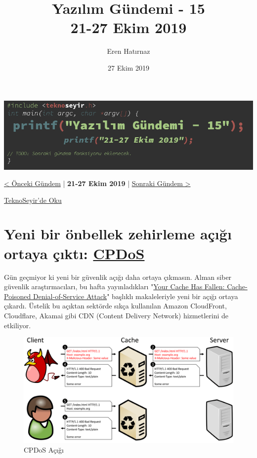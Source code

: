 \documentclass[11pt]{article}
\author{Eren Hatırnaz}
\date{27 Ekim 2019}
\title{Yazılım Gündemi - 15\\\medskip
\large 21-27 Ekim 2019}
\begin{document}
\maketitle
\tableofcontents \clearpage\shorthandoff{=}

\begin{center}
\includegraphics[width=.9\linewidth]{gorseller/yazilim-gundemi-banner.png}
\end{center}

\begin{center}
\href{../14/yazilim-gundemi-14.pdf}{< Önceki Gündem} | \textbf{21-27 Ekim 2019} | \href{../16/yazilim-gundemi-16.pdf}{Sonraki Gündem >}

\href{https://teknoseyir.com/blog/yazilim-gundemi-15-21-27-ekim-2019}{TeknoSeyir'de Oku}
\end{center}

\section{Yeni bir önbellek zehirleme açığı ortaya çıktı: \href{https://cpdos.org/}{CPDoS}}
\label{sec:org98e25e3}
Gün geçmiyor ki yeni bir güvenlik açığı daha ortaya çıkmasın. Alman siber
güvenlik araştırmacıları, bu hafta yayınladıkları "\href{https://cpdos.org/paper/Your\_Cache\_Has\_Fallen\_\_Cache\_Poisoned\_Denial\_of\_Service\_Attack\_\_Preprint\_.pdf}{Your Cache Has Fallen:
Cache-Poisoned Denial-of-Service Attack}" başlıklı makaleleriyle yeni bir açığı
ortaya çıkardı. Üstelik bu açıktan sektörde sıkça kullanılan Amazon CloudFront,
Cloudflare, Akamai gibi CDN (Content Delivery Network) hizmetlerini de
etkiliyor.

\begin{figure}[htbp]
\centering
\includegraphics[width=.9\linewidth]{gorseller/CPDoS.png}
\caption{CPDoS Açığı}
\end{figure}
\end{document}
